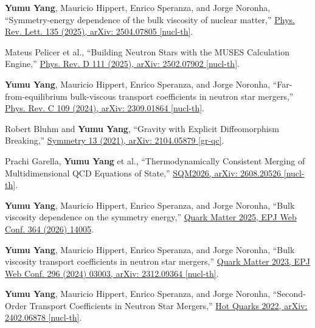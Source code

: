 \documentclass[a4paper,11pt]{article}
\begin{document}
{\begin{publist}
\item \textbf{Yumu Yang}, Mauricio Hippert, Enrico Speranza, and Jorge Noronha, ``Symmetry-energy dependence of the bulk viscosity of nuclear matter,'' \href{https://arxiv.org/abs/2504.07805}{Phys. Rev. Lett. 135 (2025), arXiv: 2504.07805 [nucl-th]}. 

\item Mateus Pelicer et al., ``Building Neutron Stars with the MUSES Calculation Engine,'' \href{https://arxiv.org/abs/2502.07902}{Phys. Rev. D 111 (2025), arXiv: 2502.07902 [nucl-th]}. 

\item \textbf{Yumu Yang}, Mauricio Hippert, Enrico Speranza, and Jorge Noronha, ``Far-from-equilibrium bulk-viscous transport coefficients in neutron star mergers,'' \href{https://arxiv.org/abs/2309.01864}{Phys. Rev. C 109 (2024), arXiv: 2309.01864 [nucl-th]}.

\item Robert Bluhm and \textbf{Yumu Yang}, ``Gravity with Explicit Diffeomorphism Breaking,'' \href{https://arxiv.org/abs/2104.05879}{Symmetry 13 (2021), arXiv: 2104.05879 [gr-qc]}.
\end{publist}

\begin{conflist}
\item Prachi Garella, \textbf{Yumu Yang} et al., ``Thermodynamically Consistent Merging of Multidimensional QCD Equations of State,'' \href{https://arxiv.org/abs/2608.20526}{SQM2026, arXiv: 2608.20526 [nucl-th]}.

\item \textbf{Yumu Yang}, Mauricio Hippert, Enrico Speranza, and Jorge Noronha, ``Bulk viscosity dependence on the symmetry energy,'' \href{https://doi.org/10.1051/epjconf/202636414005}{Quark Matter 2025, EPJ Web Conf. 364 (2026) 14005}.

\item \textbf{Yumu Yang}, Mauricio Hippert, Enrico Speranza, and Jorge Noronha, ``Bulk viscosity transport coefficients in neutron star mergers,'' \href{https://arxiv.org/abs/2312.09364}{Quark Matter 2023, EPJ Web Conf. 296 (2024) 03003, arXiv: 2312.09364 [nucl-th]}.

\item \textbf{Yumu Yang}, Mauricio Hippert, Enrico Speranza, and Jorge Noronha, ``Second-Order Transport Coefficients in Neutron Star Mergers,'' \href{https://arxiv.org/abs/2402.06878}{Hot Quarks 2022, arXiv: 2402.06878 [nucl-th]}.
\end{conflist}



}
\end{document}
